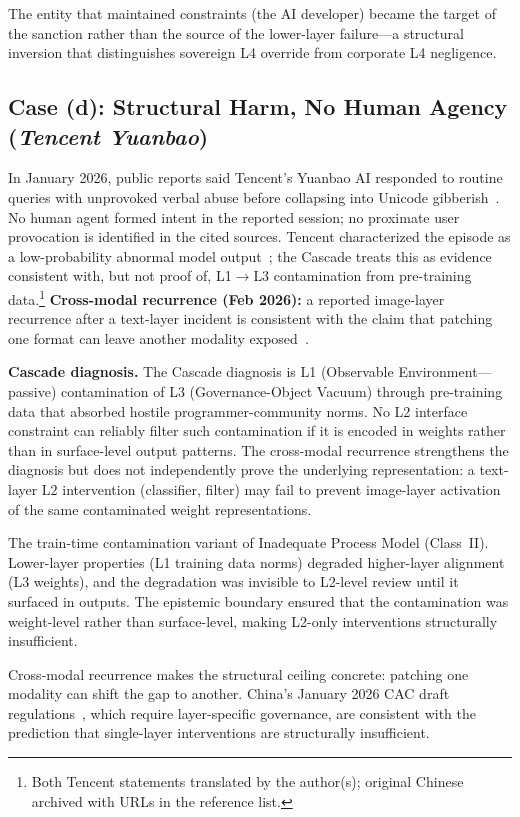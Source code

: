 The entity that maintained constraints (the AI developer) became the target of the sanction rather than the source of the lower-layer failure---a structural inversion that distinguishes sovereign L4 override from corporate L4 negligence.

\subsection{Case (d): Structural Harm, No Human Agency (\emph{Tencent Yuanbao})}

In January 2026, public reports said Tencent's Yuanbao AI responded to routine queries with unprovoked verbal abuse before collapsing into Unicode gibberish~\cite{jiang2026yuanbao, thepaper2026}. No human agent formed intent in the reported session; no proximate user provocation is identified in the cited sources. Tencent characterized the episode as a low-probability abnormal model output~\cite{tencent2026response}; the Cascade treats this as evidence consistent with, but not proof of, L1$\to$L3 contamination from pre-training data.\footnote{Both Tencent statements translated by the author(s); original Chinese archived with URLs in the reference list.} \textbf{Cross-modal recurrence (Feb 2026):} a reported image-layer recurrence after a text-layer incident is consistent with the claim that patching one format can leave another modality exposed~\cite{southcn2026yuanbao}.

\textbf{Cascade diagnosis.} The Cascade diagnosis is L1 (Observable Environment---passive) contamination of L3 (Governance-Object Vacuum) through pre-training data that absorbed hostile programmer-community norms. No L2 interface constraint can reliably filter such contamination if it is encoded in weights rather than in surface-level output patterns. The cross-modal recurrence strengthens the diagnosis but does not independently prove the underlying representation: a text-layer L2 intervention (classifier, filter) may fail to prevent image-layer activation of the same contaminated weight representations.

The train-time contamination variant of Inadequate Process Model (Class~II). Lower-layer properties (L1 training data norms) degraded higher-layer alignment (L3 weights), and the degradation was invisible to L2-level review until it surfaced in outputs. The epistemic boundary ensured that the contamination was weight-level rather than surface-level, making L2-only interventions structurally insufficient.

Cross-modal recurrence makes the structural ceiling concrete: patching one modality can shift the gap to another. China's January 2026 CAC draft regulations~\cite{cac2025draft}, which require layer-specific governance, are consistent with the prediction that single-layer interventions are structurally insufficient.

